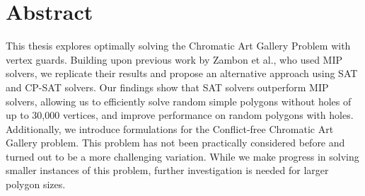 \chapter*{Abstract}
This thesis explores optimally solving the Chromatic Art Gallery Problem with vertex guards. Building upon previous work by Zambon et al., who used MIP solvers, we replicate their results and propose an alternative approach using SAT and CP-SAT solvers. Our findings show that SAT solvers outperform MIP solvers, allowing us to efficiently solve random simple polygons without holes of up to 30,000 vertices, and improve performance on random polygons with holes. Additionally, we introduce formulations for the Conflict-free Chromatic Art Gallery problem. This problem has not been practically considered before and turned out to be a more challenging variation. While we make progress in solving smaller instances of this problem, further investigation is needed for larger polygon sizes.
